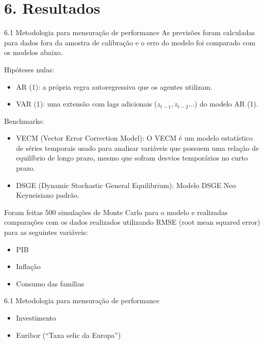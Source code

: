 \documentclass[aspectratio=169,11pt]{beamer}
\begin{document}
\section{6. Resultados}

\begin{frame}[allowframebreaks]{6.1 Metodologia para mensuração de performance}
\normalsize
As previsões foram calculadas para dados fora da amostra de calibração e o erro do modelo foi comparado com os modelos abaixo.

Hipóteses nulas:

\begin{itemize}
\item
  AR (1): a própria regra autoregressiva que os agentes utilizam.
\item
  VAR (1): uma extensão com lags adicionais (\(z_{t-1},z_{t-2}...\)) do modelo AR (1).
\end{itemize}

Benchmarks:

\begin{itemize}
\item
  VECM (Vector Error Correction Model): O VECM é um modelo estatístico de séries temporais usado para analisar variáveis que possuem uma relação de equilíbrio de longo prazo, mesmo que sofram desvios temporários no curto prazo.
\item
  DSGE (Dynamic Stochastic General Equilibrium): Modelo DSGE Neo Keyneisiano padrão.
\end{itemize}

Foram feitas 500 simulações de Monte Carlo para o modelo e realizadas comparações com os dados realizados utilizando RMSE (root mean squared error) para as seguintes variáveis:

\begin{itemize}
\item
  PIB
\item
  Inflação
\item
  Consumo das famílias
\end{itemize}
\end{frame}


\begin{frame}[allowframebreaks]{6.1 Metodologia para mensuração de performance}
\normalsize
\begin{itemize}
\item
  Investimento
\item
  Euribor (``Taxa selic da Europa'')
\end{itemize}
\end{frame}
\end{document}
